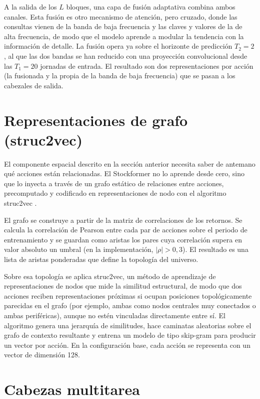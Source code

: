 A la salida de los $L$ bloques, una capa de fusión adaptativa combina ambos canales. Esta
fusión es otro mecanismo de atención, pero cruzado, donde las consultas vienen de la banda
de baja frecuencia y las claves y valores de la de alta frecuencia, de modo que el modelo
aprende a modular la tendencia con la información de detalle. La fusión opera ya sobre el
horizonte de predicción $T_2=2$, al que las dos bandas se han reducido con una proyección
convolucional desde las $T_1=20$ jornadas de entrada. El resultado son dos
representaciones por acción (la fusionada y la propia de la banda de baja frecuencia) que
se pasan a los cabezales de salida.

\section{Representaciones de grafo (struc2vec)}\label{sec:graph}

El componente espacial descrito en la sección anterior necesita saber de antemano qué
acciones están relacionadas. El Stockformer no lo aprende desde cero, sino que lo inyecta a
través de un grafo estático de relaciones entre acciones, precomputado y codificado en
representaciones de nodo con el algoritmo struc2vec \autocite{ribeiro2017struc2vec}.

El grafo se construye a partir de la matriz de correlaciones de los retornos. Se calcula
la correlación de Pearson entre cada par de acciones sobre el periodo de entrenamiento y
se guardan como aristas los pares cuya correlación supera en valor absoluto un umbral (en
la implementación, $|\rho| > 0{,}3$). El resultado es una lista de aristas ponderadas que
define la topología del universo.

Sobre esa topología se aplica struc2vec, un método de aprendizaje de representaciones de
nodos que mide la similitud estructural, de modo que dos acciones reciben representaciones
próximas si ocupan posiciones topológicamente parecidas en el grafo (por ejemplo, ambas como nodos
centrales muy conectados o ambas periféricas), aunque no estén vinculadas directamente
entre sí. El algoritmo genera una jerarquía de similitudes, hace caminatas aleatorias
sobre el grafo de contexto resultante y entrena un modelo de tipo skip-gram para producir
un vector por acción. En la configuración base, cada acción se representa con un vector de
dimensión 128.

\section{Cabezas multitarea}\label{sec:heads}

